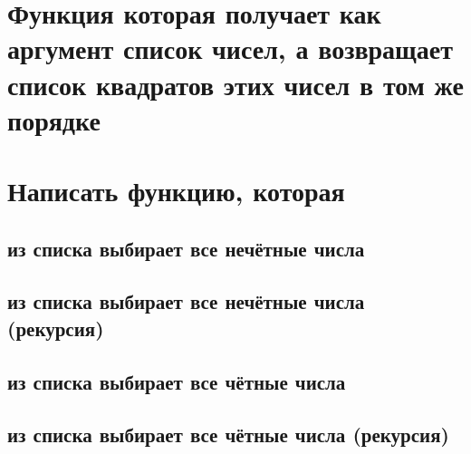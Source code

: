 \section{Функция которая получает как аргумент список чисел, а возвращает список квадратов этих чисел в том же порядке}




\section{Написать функцию, которая}

\subsection{из списка выбирает все нечётные числа}



\subsection{из списка выбирает все нечётные числа (рекурсия)}



\subsection{из списка выбирает все чётные числа}



\subsection{из списка выбирает все чётные числа (рекурсия)}

